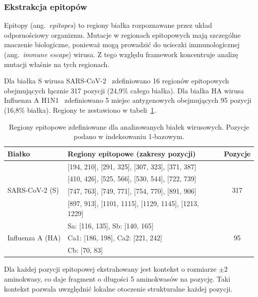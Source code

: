 \subsubsection{Ekstrakcja epitopów}
\label{subsubsec:epitopy}

Epitopy (ang.~\emph{epitopes}) to regiony białka rozpoznawane przez układ odpornościowy organizmu. Mutacje w regionach epitopowych mają szczególne znaczenie biologiczne, ponieważ mogą prowadzić do ucieczki immunologicznej (ang.~\emph{immune escape}) wirusa. Z tego względu framework koncentruje analizę mutacji właśnie na tych regionach.

Dla białka S wirusa SARS-CoV-2~\cite{walls2020spike} zdefiniowano 16 regionów epitopowych obejmujących łącznie 317 pozycji (24{,}9\% całego białka). Dla białka HA wirusa Influenza A H1N1~\cite{caton1982influenza} zdefiniowano 5 miejsc antygenowych obejmujących 95 pozycji (16{,}8\% białka). Regiony te zestawiono w tabeli~\ref{tab:epitopes}.

\begin{table}[H]
\centering
\caption{Regiony epitopowe zdefiniowane dla analizowanych białek wirusowych. Pozycje podano w indeksowaniu 1-bazowym.}
\label{tab:epitopes}
\small
\begin{tabular}{llc}
\toprule
\textbf{Białko} & \textbf{Regiony epitopowe (zakresy pozycji)} & \textbf{Pozycje} \\
\midrule
\multirow{4}{*}{SARS-CoV-2 (S)}
    & [194, 210], [291, 325], [307, 323], [371, 387] & \multirow{4}{*}{317} \\
    & [410, 426], [525, 566], [530, 544], [722, 739] & \\
    & [747, 763], [749, 771], [754, 770], [891, 906] & \\
    & [897, 913], [1101, 1115], [1129, 1145], [1213, 1229] & \\
\midrule
\multirow{3}{*}{Influenza A (HA)}
    & Sa: [116, 135], Sb: [140, 165] & \multirow{3}{*}{95} \\
    & Ca1: [186, 198], Ca2: [221, 242] & \\
    & Cb: [70, 83] & \\
\bottomrule
\end{tabular}
\end{table}

Dla każdej pozycji epitopowej ekstrahowany jest kontekst o rozmiarze $\pm 2$ aminokwasy, co daje fragment o długości 5 aminokwasów na pozycję. Taki kontekst pozwala uwzględnić lokalne otoczenie strukturalne każdej pozycji.

